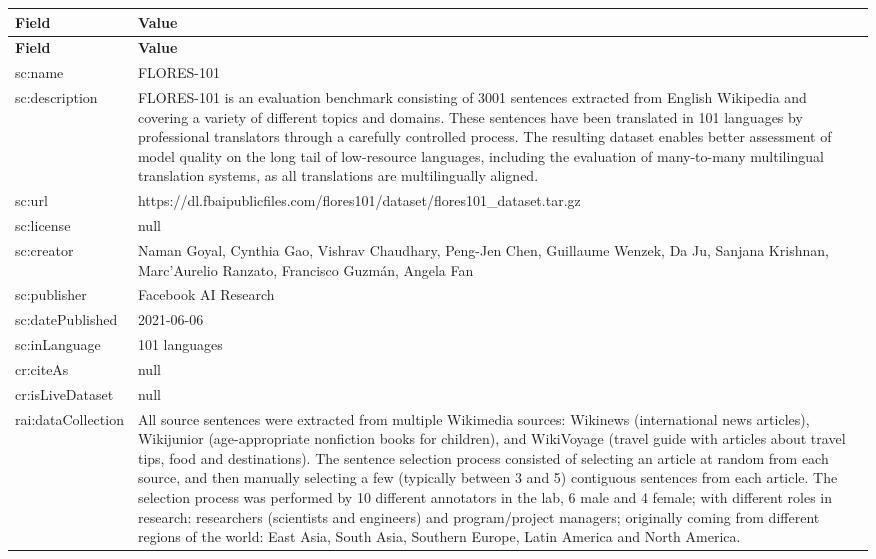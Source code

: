 \documentclass[10pt,a4paper]{article}
\begin{document}
\begin{longtable}{|p{4cm}|p{12cm}|}
\hline
\textbf{Field} & \textbf{Value} \\
\hline
\endfirsthead
\hline
\textbf{Field} & \textbf{Value} \\
\hline
\endhead
\hline
\endfoot

sc:name & FLORES-101 \\
\hline
sc:description & FLORES-101 is an evaluation benchmark consisting of 3001 sentences extracted from English Wikipedia and covering a variety of different topics and domains. These sentences have been translated in 101 languages by professional translators through a carefully controlled process. The resulting dataset enables better assessment of model quality on the long tail of low-resource languages, including the evaluation of many-to-many multilingual translation systems, as all translations are multilingually aligned. \\
\hline
sc:url & https://dl.fbaipublicfiles.com/flores101/dataset/flores101\_dataset.tar.gz \\
\hline
sc:license & null \\
\hline
sc:creator & Naman Goyal, Cynthia Gao, Vishrav Chaudhary, Peng-Jen Chen, Guillaume Wenzek, Da Ju, Sanjana Krishnan, Marc'Aurelio Ranzato, Francisco Guzm\'{a}n, Angela Fan \\
\hline
sc:publisher & Facebook AI Research \\
\hline
sc:datePublished & 2021-06-06 \\
\hline
sc:inLanguage & 101 languages \\
\hline
cr:citeAs & null \\
\hline
cr:isLiveDataset & null \\
\hline
rai:dataCollection & All source sentences were extracted from multiple Wikimedia sources: Wikinews (international news articles), Wikijunior (age-appropriate nonfiction books for children), and WikiVoyage (travel guide with articles about travel tips, food and destinations). The sentence selection process consisted of selecting an article at random from each source, and then manually selecting a few (typically between 3 and 5) contiguous sentences from each article. The selection process was performed by 10 different annotators in the lab, 6 male and 4 female; with different roles in research: researchers (scientists and engineers) and program/project managers; originally coming from different regions of the world: East Asia, South Asia, Southern Europe, Latin America and North America. \\

\end{longtable}
\end{document}
